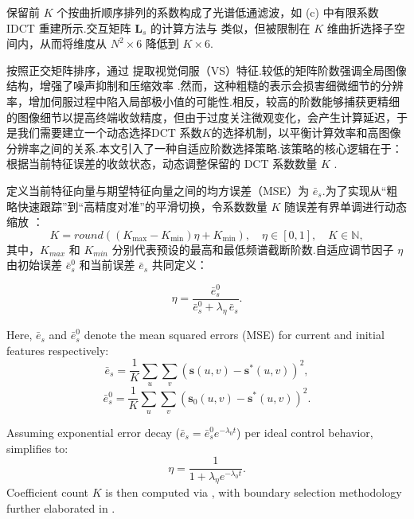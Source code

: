 \documentclass{article}
\begin{document}
保留前 \(K\) 个按曲折顺序排列的系数构成了光谱低通滤波，如 (c) 中有限系数 IDCT 重建所示.交互矩阵 \(\boldsymbol{L}_s\) 的计算方法与  类似，但被限制在 \(K\) 维曲折选择子空间内，从而将维度从 \(N^2 \times 6\) 降低到 \(K \times 6\).


按照正交矩阵排序，通过  提取视觉伺服（VS）特征.较低的矩阵阶数强调全局图像结构，增强了噪声抑制和压缩效率 \cite{chen2024direct}.然而，这种粗糙的表示会损害细微细节的分辨率，增加伺服过程中陷入局部极小值的可能性.相反，较高的阶数能够捕获更精细的图像细节以提高终端收敛精度，但由于过度关注微观变化，会产生计算延迟，于是我们需要建立一个动态选择DCT 系数\(K\)的选择机制，以平衡计算效率和高图像分辨率之间的关系.本文引入了一种自适应阶数选择策略.该策略的核心逻辑在于：根据当前特征误差的收敛状态，动态调整保留的 DCT 系数数量 $K$ .

定义当前特征向量与期望特征向量之间的均方误差（MSE）为 $\bar{e}_s$.为了实现从“粗略快速跟踪”到“高精度对准”的平滑切换，令系数数量 $K$ 随误差有界单调进行动态缩放 ：
\begin{equation}
K = round(\left(K_{\max} - K_{\min}\right) \eta + K_{\min}), \quad \eta \in [0, 1], \quad K \in \mathbb{N},
\end{equation}
其中，$K_{max}$ 和 $K_{min}$ 分别代表预设的最高和最低频谱截断阶数.自适应调节因子 $\eta$ 由初始误差 $\bar{e}_s^0$ 和当前误差 $\bar{e}_s$ 共同定义：

\begin{equation}
\eta = \frac{\bar{e}_s^0}{\bar{e}_s^0 + \lambda_\eta \, \bar{e}_s}.
\end{equation}

Here, \(\bar{e}_s\) and \(\bar{e}_s^0\) denote the mean squared errors (MSE) for current and initial features respectively:
\begin{equation}
\bar{e}_s = \frac{1}{K} \sum_u \sum_v \left(\boldsymbol{s}(u, v) - \boldsymbol{s}^{*}(u, v)\right)^2,
\end{equation}
\begin{equation}
\bar{e}_s^0 = \frac{1}{K} \sum_u \sum_v \left(\boldsymbol{s}_0(u, v) - \boldsymbol{s}^{*}(u, v)\right)^2.
\end{equation}

Assuming exponential error decay (\(\bar{e}_s = \bar{e}_s^0 e^{-\lambda_0 t}\)) per ideal control behavior,  simplifies to:
\begin{equation}
\eta = \frac{1}{1 + \lambda_\eta e^{-\lambda_0 t}}.
\end{equation}
Coefficient count \(K\) is then computed via , with boundary selection methodology further elaborated in .
\end{document}
